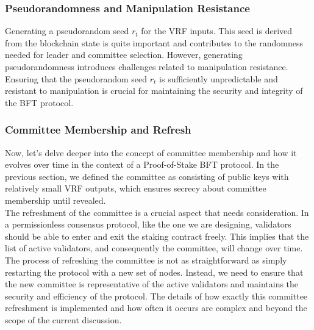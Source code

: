 \subsubsection{Pseudorandomness and Manipulation Resistance}
Generating a pseudorandom seed $r_t$ for the VRF inputs. This seed is derived from the blockchain state is quite important and contributes to the randomness needed for leader and committee selection. However, generating pseudorandomness introduces challenges related to manipulation resistance.\\
Ensuring that the pseudorandom seed $r_t$ is sufficiently unpredictable and resistant to manipulation is crucial for maintaining the security and integrity of the BFT protocol. 
\subsubsection{Committee Membership and Refresh}
Now, let's delve deeper into the concept of committee membership and how it evolves over time in the context of a Proof-of-Stake BFT protocol. In the previous section, we defined the committee as consisting of public keys with relatively small VRF outputs, which ensures secrecy about committee membership until revealed.\\
The refreshment of the committee is a crucial aspect that needs consideration. In a permissionless consensus protocol, like the one we are designing, validators should be able to enter and exit the staking contract freely. This implies that the list of active validators, and consequently the committee, will change over time.\\
The process of refreshing the committee is not as straightforward as simply restarting the protocol with a new set of nodes. Instead, we need to ensure that the new committee is representative of the active validators and maintains the security and efficiency of the protocol. The details of how exactly this committee refreshment is implemented and how often it occurs are complex and beyond the scope of the current discussion.

